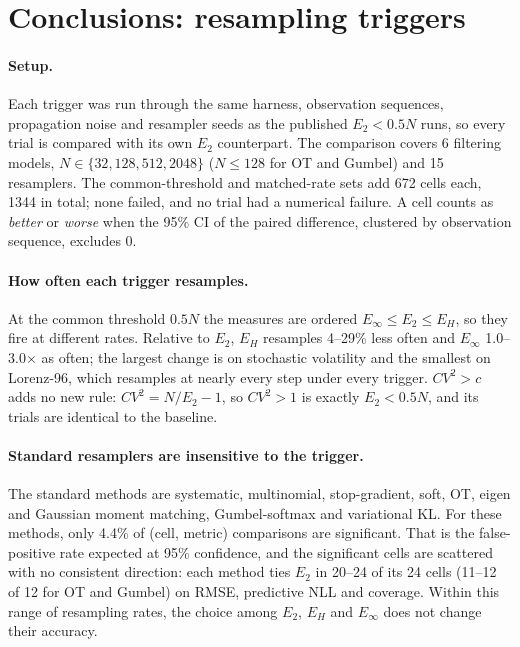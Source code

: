 \clearpage
\section*{Conclusions: resampling triggers}

\paragraph{Setup.} Each trigger was run through the same harness, observation sequences, propagation noise and resampler seeds as the published $E_2<0.5N$ runs, so every trial is compared with its own $E_2$ counterpart. The comparison covers 6 filtering models, $N\in\{32,128,512,2048\}$ ($N\le128$ for OT and Gumbel) and 15 resamplers. The common-threshold and matched-rate sets add 672 cells each, 1344 in total; none failed, and no trial had a numerical failure. A cell counts as \emph{better} or \emph{worse} when the 95\% CI of the paired difference, clustered by observation sequence, excludes 0.

\paragraph{How often each trigger resamples.} At the common threshold $0.5N$ the measures are ordered $E_\infty\le E_2\le E_H$, so they fire at different rates. Relative to $E_2$, $E_H$ resamples 4--29\% less often and $E_\infty$ 1.0--3.0$\times$ as often; the largest change is on stochastic volatility and the smallest on Lorenz-96, which resamples at nearly every step under every trigger. $CV^2>c$ adds no new rule: $CV^2=N/E_2-1$, so $CV^2>1$ is exactly $E_2<0.5N$, and its trials are identical to the baseline.

\paragraph{Standard resamplers are insensitive to the trigger.} The standard methods are systematic, multinomial, stop-gradient, soft, OT, eigen and Gaussian moment matching, Gumbel-softmax and variational KL. For these methods, only 4.4\% of (cell, metric) comparisons are significant. That is the false-positive rate expected at 95\% confidence, and the significant cells are scattered with no consistent direction: each method ties $E_2$ in 20--24 of its 24 cells (11--12 of 12 for OT and Gumbel) on RMSE, predictive NLL and coverage. Within this range of resampling rates, the choice among $E_2$, $E_H$ and $E_\infty$ does not change their accuracy.


